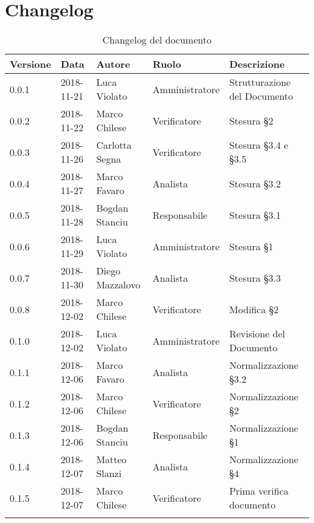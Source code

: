 \section{Changelog}

\begin{center}
\begin{longtable}[c]{|m{}|m{}|m{}|m{}|p{}|}
\hline
\textbf{Versione} & \textbf{Data} & \textbf{Autore} & \textbf{Ruolo} & \textbf{Descrizione} \\
\hline \hline
\endfirsthead
0.0.1 & 2018-11-21 & Luca Violato & Amministratore & Strutturazione del Documento \\
\hline
0.0.2 & 2018-11-22 & Marco Chilese & Verificatore & Stesura §2 \\
\hline
0.0.3 & 2018-11-26 & Carlotta Segna & Verificatore & Stesura §3.4 e §3.5 \\
\hline
0.0.4 & 2018-11-27 & Marco Favaro & Analista & Stesura §3.2 \\
\hline
0.0.5 & 2018-11-28 & Bogdan Stanciu & Responsabile & Stesura §3.1\\
\hline
0.0.6 & 2018-11-29 & Luca Violato & Amministratore & Stesura §1 \\
\hline
0.0.7 & 2018-11-30 & Diego Mazzalovo & Analista & Stesura §3.3 \\
\hline
0.0.8 & 2018-12-02 & Marco Chilese & Verificatore & Modifica §2 \\
\hline
0.1.0 & 2018-12-02 & Luca Violato & Amministratore & Revisione del Documento\\
\hline
0.1.1 & 2018-12-06 & Marco Favaro & Analista & Normalizzazione §3.2\\
\hline
0.1.2 & 2018-12-06 & Marco Chilese & Verificatore & Normalizzazione §2\\
\hline
0.1.3 & 2018-12-06 & Bogdan Stanciu & Responsabile & Normalizzazione §1\\
\hline
0.1.4 & 2018-12-07 & Matteo Slanzi & Analista & Normalizzazione §4\\
\hline
0.1.5 & 2018-12-07 & Marco Chilese & Verificatore & Prima verifica documento\\
\hline
\caption{Changelog del documento}
\end{longtable}
\end{center}
